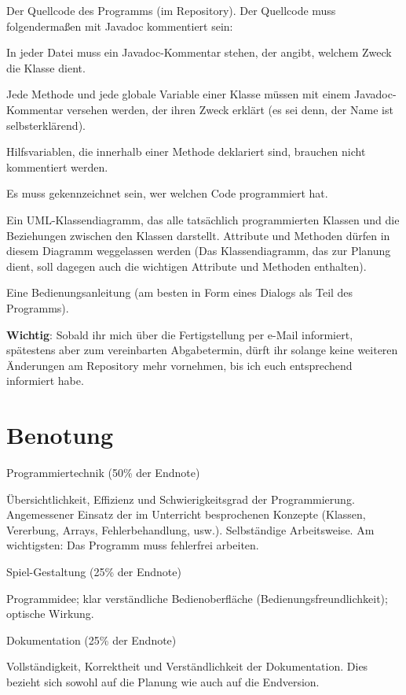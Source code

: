 \begin{compactitem}
\item Der Quellcode des Programms (im Repository). Der Quellcode muss
folgendermaßen mit Javadoc kommentiert sein:

\begin{compactitem}
\item In jeder Datei muss ein Javadoc-Kommentar stehen, der angibt, welchem
Zweck die Klasse dient.
\item Jede Methode und jede globale Variable einer Klasse müssen mit einem
Javadoc-Kommentar versehen werden, der ihren Zweck erklärt (es sei denn, der
Name ist selbsterklärend).
\item Hilfsvariablen, die innerhalb einer Methode deklariert sind, brauchen
nicht kommentiert werden.
\item Es muss gekennzeichnet sein, wer welchen Code programmiert hat.
\end{compactitem}

\item Ein UML-Klassendiagramm, das alle tatsächlich programmierten Klassen und
die Beziehungen zwischen den Klassen darstellt. Attribute und Methoden dürfen
in diesem Diagramm weggelassen werden (Das Klassendiagramm, das zur Planung
dient, soll dagegen auch die wichtigen Attribute und Methoden enthalten).

\item Eine Bedienungsanleitung (am besten in Form eines Dialogs als Teil des
Programms).

\end{compactitem}

\textbf{Wichtig}: Sobald ihr mich über die Fertigstellung per e-Mail informiert,
spätestens aber zum vereinbarten Abgabetermin, dürft ihr solange keine weiteren
Änderungen am Repository mehr vornehmen, bis ich euch entsprechend informiert
habe.


\section{Benotung}

\begin{compactenum}[a)]
\item  Programmiertechnik (50\% der Endnote)

Übersichtlichkeit, Effizienz und Schwierigkeitsgrad der Programmierung.
Angemessener Einsatz der im Unterricht besprochenen Konzepte (Klassen,
Vererbung, Arrays, Fehlerbehandlung, usw.). Selbständige Arbeitsweise.
Am wichtigsten: Das Programm muss fehlerfrei arbeiten.

\item Spiel-Gestaltung (25\% der Endnote)

Programmidee; klar verständliche Bedienoberfläche (Bedienungsfreundlichkeit);
optische Wirkung.

\item Dokumentation (25\% der Endnote)

Vollständigkeit, Korrektheit und Verständlichkeit der Dokumentation. Dies
bezieht sich sowohl auf die Planung wie auch auf die Endversion.
\end{compactenum}



